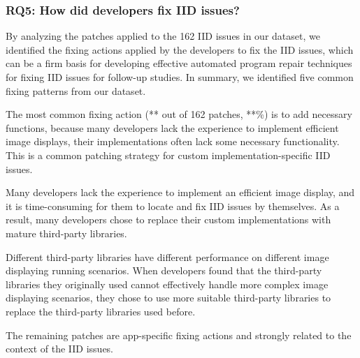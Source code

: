

\subsubsection{RQ5: How did developers fix IID issues?} \label{subsec:rq5-answer}

By analyzing the patches applied to the 162 IID issues in our dataset, we identified the fixing actions applied by the developers to fix the IID issues, which can be a firm basis for developing effective automated program repair techniques for fixing IID issues for follow-up studies. In summary, we identified five common fixing patterns from our dataset.

The most common fixing action (** out of 162 patches, **\%) is to add necessary functions, because many developers lack the experience to implement efficient image displays, their implementations often lack some necessary functionality. This is a common patching strategy for custom implementation-specific IID issues.

Many developers lack the experience to implement an efficient image display, and it is time-consuming for them to locate and fix IID issues by themselves. As a result, many developers chose to replace their custom implementations with mature third-party libraries.

Different third-party libraries have different performance on different image displaying running scenarios. 
When developers found that the third-party libraries they originally used cannot effectively handle more complex image displaying scenarios, they chose to use more suitable third-party libraries to replace the third-party libraries used before.

\TODO{}

\TODO{}

The remaining patches are app-specific fixing actions and strongly related to the context of the IID issues.


